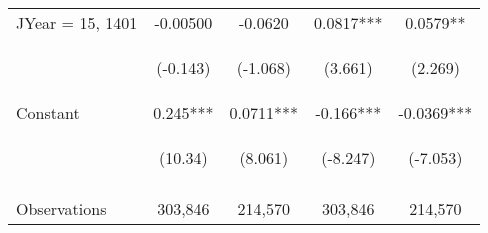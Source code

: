 \documentclass[]{article}
\begin{document}
\begin{center}
\begin{tabular}{lcccc}
        JYear = 15, 1401 & -0.00500                                        & -0.0620                                        & 0.0817***                                      & 0.0579**                                       \\
        \vspace{4pt}     & \begin{footnotesize}(-0.143)\end{footnotesize}  & \begin{footnotesize}(-1.068)\end{footnotesize} & \begin{footnotesize}(3.661)\end{footnotesize}  & \begin{footnotesize}(2.269)\end{footnotesize}  \\
        Constant         & 0.245***                                        & 0.0711***                                      & -0.166***                                      & -0.0369***                                     \\
                         & \begin{footnotesize}(10.34)\end{footnotesize}   & \begin{footnotesize}(8.061)\end{footnotesize}  & \begin{footnotesize}(-8.247)\end{footnotesize} & \begin{footnotesize}(-7.053)\end{footnotesize} \\
        \vspace{4pt}     & \begin{footnotesize}\end{footnotesize}          & \begin{footnotesize}\end{footnotesize}         & \begin{footnotesize}\end{footnotesize}         & \begin{footnotesize}\end{footnotesize}         \\
        Observations     & 303,846                                         & 214,570                                        & 303,846                                        & 214,570                                        \\

\end{tabular}
\end{center}
\end{document}
